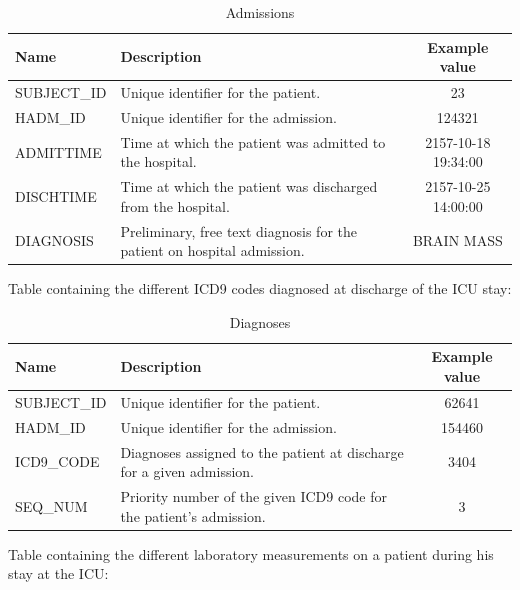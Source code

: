 \begin{table}[H]
 \begin{center}
  \caption{Admissions}
  \begin{tabular}{| l | p{7cm} | c | }
   \hline
   \textbf{Name} & \textbf{Description} & \textbf{Example value} \\ \hline
   SUBJECT\_ID &  Unique identifier for the patient. & 23 \\ \hline
   HADM\_ID & Unique identifier for the admission. & 124321 \\ \hline
   ADMITTIME & Time at which the patient was admitted to the hospital. & 2157-10-18 19:34:00 \\ \hline
   DISCHTIME & Time at which the patient was discharged from the hospital. & 2157-10-25 14:00:00 \\ \hline
   DIAGNOSIS & Preliminary, free text diagnosis for the patient on hospital admission. & BRAIN MASS \\
   \hline
  \end{tabular}
 \end{center}
\end{table}

Table containing the different ICD9 codes diagnosed at discharge of the ICU stay:

\begin{table}[H]
 \begin{center}
  \caption{Diagnoses}
  \begin{tabular}{| l | p{7cm} | c | }
   \hline
   \textbf{Name} & \textbf{Description} & \textbf{Example value} \\ \hline
   SUBJECT\_ID &  Unique identifier for the patient. & 62641 \\ \hline
   HADM\_ID & Unique identifier for the admission. & 154460 \\ \hline
   ICD9\_CODE & Diagnoses assigned to the patient at discharge for a given admission. & 3404 \\ \hline
   SEQ\_NUM & Priority number of the given ICD9 code for the patient's admission. & 3 \\
   \hline
  \end{tabular}
 \end{center}
\end{table}

Table containing the different laboratory measurements on a patient during his stay at the ICU:

